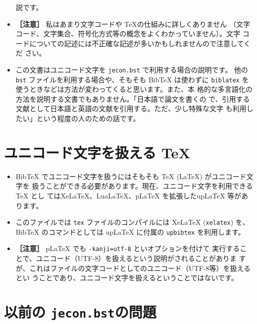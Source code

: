 \documentclass[a4paper,10pt]{bxjsarticle}
\begin{document}
\begin{itemize}
       説です。
 \item \textbf{［注意］} 私はあまり文字コードや \TeX の仕組みに詳しくありません
       （文字コード、文字集合、符号化方式等の概念をよくわかっていません）。文字
       コードについての記述には不正確な記述が多いかもしれませんので注意してくだ
       さい。
 \item この文書はユニコード文字を \texttt{jecon.bst} で利用する場合の説明です。
       他の \texttt{bst} ファイルを利用する場合や、そもそも BibTeX は使わずに
       \texttt{biblatex} を使うときなどは方法が変わってくると思います。また、本
       格的な多言語化の方法を説明する文書でもありません。「日本語で論文を書くの
       で、引用する文献として日本語と英語の文献を引用する。ただ、少し特殊な文字
       も利用したい」という程度の人のための話です。
\end{itemize}

\section{ユニコード文字を扱える \TeX}

\begin{itemize}
 \item BibTeX でユニコード文字を扱うにはそもそも TeX (LaTeX) がユニコード文字を
       扱うことができる必要があります。現在、ユニコード文字を利用できる TeX とし
       てはXeLaTeX、LuaLaTeX、pLaTeX を拡張したupLaTeX 等があります。
 \item このファイルでは \texttt{tex} ファイルのコンパイルには XeLaTeX
       (\texttt{xelatex}) を、BibTeX のコマンドとしては upLaTeX に付属の
       \texttt{upbibtex} を利用します。
 \item \textbf{［注意］} pLaTeX でも \verb|-kanji=utf-8| といオプションを付けて
       実行することで、ユニコード（UTF-8）を扱えるという説明がされることがありま
       すが、これはファイルの文字コードとしてのユニコード（UTF-8等）を扱えるとい
       うことであり、ユニコード文字を扱えるということではないです。
\end{itemize}

\section{以前の \texttt{jecon.bst}の問題}
\label{jecon-problem}
\end{document}
